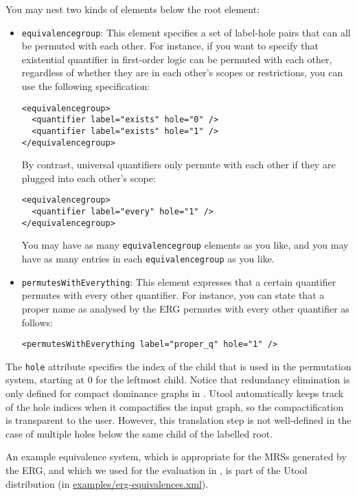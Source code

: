You may nest two kinds of elements below the root element:
\begin{itemize}
\item \verb?equivalencegroup?: This element specifies a set of
label-hole pairs that can all be permuted with each other. For
instance, if you want to specify that existential quantifier in
first-order logic can be permuted with each other, regardless of
whether they are in each other's scopes or restrictions, you can use
the following specification:
\begin{verbatim}
<equivalencegroup>
  <quantifier label="exists" hole="0" />
  <quantifier label="exists" hole="1" />
</equivalencegroup>
\end{verbatim}

By contrast, universal quantifiers only permute with each other if
they are plugged into each other's scope:
\begin{verbatim}
<equivalencegroup>
  <quantifier label="every" hole="1" />
</equivalencegroup>
\end{verbatim}

You may have as many \verb?equivalencegroup? elements as you
like, and you may have as many entries in each \verb?equivalencegroup?
as you like.

\item \verb?permutesWithEverything?: This element expresses that a
certain quantifier permutes with every other quantifier. For instance,
you can state that a proper name as analysed by the ERG permutes with
every other quantifier as follows:

\begin{verbatim}
<permutesWithEverything label="proper_q" hole="1" />
\end{verbatim}
\end{itemize}

The \verb?hole? attribute specifies the index of the child that is
used in the permutation system, starting at 0 for the leftmost
child. Notice that redundancy elimination is only defined for compact
dominance graphs in \cite{koller06}. Utool automatically keeps track
of the hole indices when it compactifies the input graph, so the
compactification is transparent to the user. However, this translation
step is not well-defined in the case of multiple holes below the same
child of the labelled root.

An example equivalence system, which is appropriate for the MRSs
generated by the ERG, and which we used for the evaluation in
\cite{koller06}, is part of the Utool distribution (in
\url{examples/erg-equivalences.xml}). 




